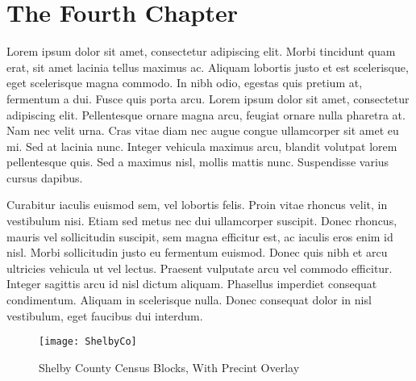 \chapter{The Fourth Chapter} \label{ch:4}

Lorem ipsum dolor sit amet, consectetur adipiscing elit. Morbi tincidunt quam erat, sit amet lacinia tellus maximus ac. Aliquam lobortis justo et est scelerisque, eget scelerisque magna commodo. In nibh odio, egestas quis pretium at, fermentum a dui. Fusce quis porta arcu. Lorem ipsum dolor sit amet, consectetur adipiscing elit. Pellentesque ornare magna arcu, feugiat ornare nulla pharetra at. Nam nec velit urna. Cras vitae diam nec augue congue ullamcorper sit amet eu mi. Sed at lacinia nunc. Integer vehicula maximus arcu, blandit volutpat lorem pellentesque quis. Sed a maximus nisl, mollis mattis nunc. Suspendisse varius cursus dapibus.

Curabitur iaculis euismod sem, vel lobortis felis. Proin vitae rhoncus velit, in vestibulum nisi. Etiam sed metus nec dui ullamcorper suscipit. Donec rhoncus, mauris vel sollicitudin suscipit, sem magna efficitur est, ac iaculis eros enim id nisl. Morbi sollicitudin justo eu fermentum euismod. Donec quis nibh et arcu ultricies vehicula ut vel lectus. Praesent vulputate arcu vel commodo efficitur. Integer sagittis arcu id nisl dictum aliquam. Phasellus imperdiet consequat condimentum. Aliquam in scelerisque nulla. Donec consequat dolor in nisl vestibulum, eget faucibus dui interdum.


\begin{landscape} 
	\thispagestyle{empty}
	\begin{figure}[!htbp] 
		\centering
		\texttt{[image: ShelbyCo]} 
		\caption{Shelby County Census Blocks, With Precint Overlay}
		\label{figure}
	\end{figure}
	\raisebox{-.5in}{\makebox[\linewidth]{\thepage}}
\end{landscape}



